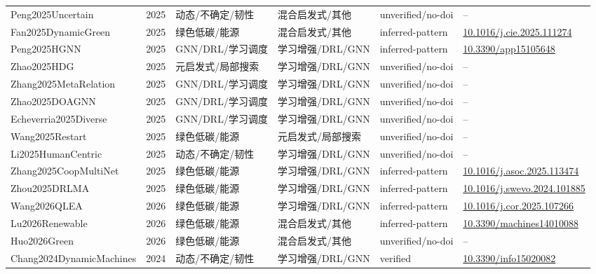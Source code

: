 \documentclass[UTF8,a4paper,11pt]{ctexart}
\begin{document}
\begin{landscape}
\begin{longtable}{>{\raggedright\arraybackslash}p{5.0cm}p{0.8cm}>{\raggedright\arraybackslash}p{2.6cm}>{\raggedright\arraybackslash}p{2.8cm}>{\raggedright\arraybackslash}p{2.6cm}>{\raggedright\arraybackslash}p{5.4cm}}
Peng2025Uncertain & 2025 & 动态/不确定/韧性 & 混合启发式/其他 & unverified/no-doi & -- \\
Fan2025DynamicGreen & 2025 & 绿色低碳/能源 & 混合启发式/其他 & inferred-pattern & \href{https://doi.org/10.1016/j.cie.2025.111274}{10.1016/j.cie.2025.111274} \\
Peng2025HGNN & 2025 & GNN/DRL/学习调度 & 学习增强/DRL/GNN & inferred-pattern & \href{https://doi.org/10.3390/app15105648}{10.3390/app15105648} \\
Zhao2025HDG & 2025 & 元启发式/局部搜索 & 学习增强/DRL/GNN & unverified/no-doi & -- \\
Zhang2025MetaRelation & 2025 & GNN/DRL/学习调度 & 学习增强/DRL/GNN & unverified/no-doi & -- \\
Zhao2025DOAGNN & 2025 & GNN/DRL/学习调度 & 学习增强/DRL/GNN & unverified/no-doi & -- \\
Echeverria2025Diverse & 2025 & GNN/DRL/学习调度 & 学习增强/DRL/GNN & unverified/no-doi & -- \\
Wang2025Restart & 2025 & 绿色低碳/能源 & 元启发式/局部搜索 & unverified/no-doi & -- \\
Li2025HumanCentric & 2025 & 动态/不确定/韧性 & 学习增强/DRL/GNN & unverified/no-doi & -- \\
Zhang2025CoopMultiNet & 2025 & 绿色低碳/能源 & 学习增强/DRL/GNN & inferred-pattern & \href{https://doi.org/10.1016/j.asoc.2025.113474}{10.1016/j.asoc.2025.113474} \\
Zhou2025DRLMA & 2025 & 绿色低碳/能源 & 学习增强/DRL/GNN & inferred-pattern & \href{https://doi.org/10.1016/j.swevo.2024.101885}{10.1016/j.swevo.2024.101885} \\
Wang2026QLEA & 2026 & 绿色低碳/能源 & 学习增强/DRL/GNN & inferred-pattern & \href{https://doi.org/10.1016/j.cor.2025.107266}{10.1016/j.cor.2025.107266} \\
Lu2026Renewable & 2026 & 绿色低碳/能源 & 混合启发式/其他 & inferred-pattern & \href{https://doi.org/10.3390/machines14010088}{10.3390/machines14010088} \\
Huo2026Green & 2026 & 绿色低碳/能源 & 混合启发式/其他 & unverified/no-doi & -- \\
Chang2024DynamicMachines & 2024 & 动态/不确定/韧性 & 学习增强/DRL/GNN & verified & \href{https://doi.org/10.3390/info15020082}{10.3390/info15020082} \\
\bottomrule
\end{longtable}
\end{landscape}
\normalsize
\end{document}
